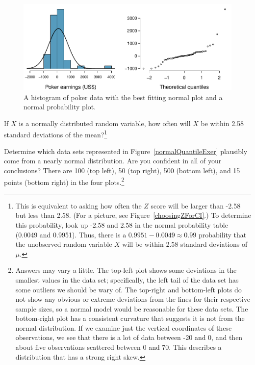\begin{figure}[H]
\centering
\includegraphics[width=\textwidth]{03/figures/pokerNormal/pokerNormal}
\caption{A histogram of poker data with the best fitting normal plot and a normal probability plot.}
\label{pokerNormal}
\end{figure}





\begin{exercise} \label{leadInForMakingA99PercentCIExercise}
If $X$ is a normally distributed random variable, how often will $X$ be within 2.58 standard deviations of the mean?\footnote{This is equivalent to asking how often the $Z$ score will be larger than -2.58 but less than 2.58. (For a picture, see Figure~\ref{choosingZForCI}.) To determine this probability, look up -2.58 and 2.58 in the normal probability table (0.0049 and 0.9951). Thus, there is a $0.9951-0.0049 \approx 0.99$ probability that the unobserved random variable $X$ will be within 2.58 standard deviations of $\mu$.}
\end{exercise}



\begin{exercise}\label{normalQuantileExercise}
Determine which data sets represented in Figure~\ref{normalQuantileExer} plausibly come from a nearly normal distribution. Are you confident in all of your conclusions? There are 100 (top left), 50 (top right), 500 (bottom left), and 15 points (bottom right) in the four plots.\footnote{Answers may vary a little. The top-left plot shows some deviations in the smallest values in the data set; specifically, the left tail of the data set has some outliers we should be wary of. The top-right and bottom-left plots do not show any obvious or extreme deviations from the lines for their respective sample sizes, so a normal model would be reasonable for these data sets. The bottom-right plot has a consistent curvature that suggests it is not from the normal distribution. If we examine just the vertical coordinates of these observations, we see that there is a lot of data between -20 and 0, and then about five observations scattered between 0 and 70. This describes a distribution that has a strong right skew.}
\end{exercise}

